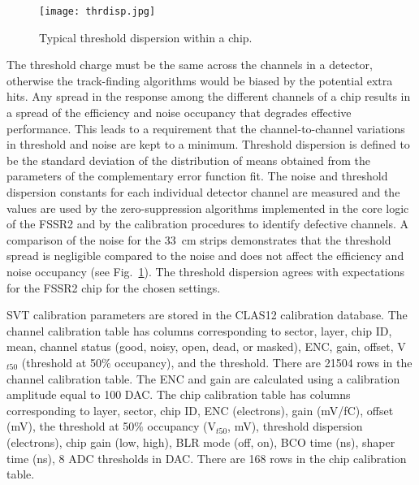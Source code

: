 \begin{figure}[hbt] 
	\centering 
	\texttt{[image: thrdisp.jpg]}
	\caption{Typical threshold dispersion within a chip.}
	\label{fig:thrdisp}
\end{figure}

The threshold charge must be the same across the channels in a detector, otherwise the track-finding algorithms would be biased by the potential extra hits. Any spread in the response among the different channels of a chip results in a spread of the efficiency and noise occupancy that degrades effective performance. This leads to a requirement that the channel-to-channel variations in threshold and noise are kept to a minimum. Threshold dispersion is defined to be the standard deviation of the distribution of means obtained from the parameters of the complementary error function fit. The noise and threshold dispersion constants for each individual detector channel are measured and the values are used by the zero-suppression algorithms implemented in the core logic of the FSSR2 and by the calibration procedures to identify defective channels. A comparison of the noise for the 33~cm strips demonstrates that the threshold spread is negligible compared to the noise and does not affect the efficiency and noise occupancy (see Fig.~\ref{fig:thrdisp}). The threshold dispersion agrees with expectations for the FSSR2 chip for the chosen settings.

SVT calibration parameters are stored in the CLAS12 calibration database. The channel calibration table has columns corresponding to sector, layer, chip ID, mean, channel status (good, noisy, open, dead, or masked), ENC, gain, offset, V$_{t50}$ (threshold at 50$\%$ occupancy), and the threshold. There are 21504 rows in the channel calibration table. The ENC and gain are calculated using a calibration amplitude equal to 100 DAC.
The chip calibration table has columns corresponding to layer, sector, chip ID, ENC (electrons), gain (mV/fC), offset (mV), the threshold at 50$\%$ occupancy (V$_{t50}$, mV), threshold dispersion (electrons), chip gain (low, high), BLR mode (off, on), BCO time (ns), shaper time (ns), 8 ADC thresholds in DAC. There are 168 rows in the chip calibration table. 

